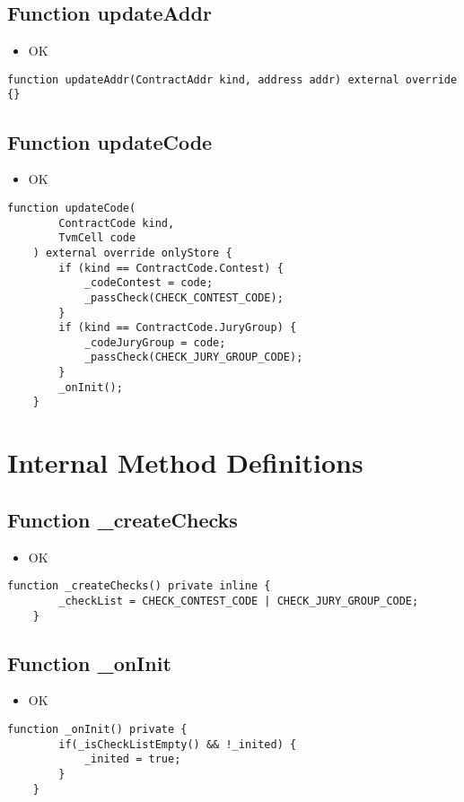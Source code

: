 \subsection{Function updateAddr}

\begin{itemize}
\item OK
\end{itemize}

\begin{lstlisting}[firstnumber=77]
    function updateAddr(ContractAddr kind, address addr) external override {}
\end{lstlisting}

\subsection{Function updateCode}

\begin{itemize}
\item OK
\end{itemize}

\begin{lstlisting}[firstnumber=62]
    function updateCode(
        ContractCode kind,
        TvmCell code
    ) external override onlyStore {
        if (kind == ContractCode.Contest) {
            _codeContest = code;
            _passCheck(CHECK_CONTEST_CODE);
        }
        if (kind == ContractCode.JuryGroup) {
            _codeJuryGroup = code;
            _passCheck(CHECK_JURY_GROUP_CODE);
        }
        _onInit();
    }
\end{lstlisting}

\section{Internal Method Definitions}


\subsection{Function \_{}createChecks}

\begin{itemize}
\item OK
\end{itemize}

\begin{lstlisting}[firstnumber=21]
    function _createChecks() private inline {
        _checkList = CHECK_CONTEST_CODE | CHECK_JURY_GROUP_CODE;
    }
\end{lstlisting}

\subsection{Function \_{}onInit}

\begin{itemize}
\item OK
\end{itemize}

\begin{lstlisting}[firstnumber=56]
    function _onInit() private {
        if(_isCheckListEmpty() && !_inited) {
            _inited = true;
        }
    }
\end{lstlisting}
